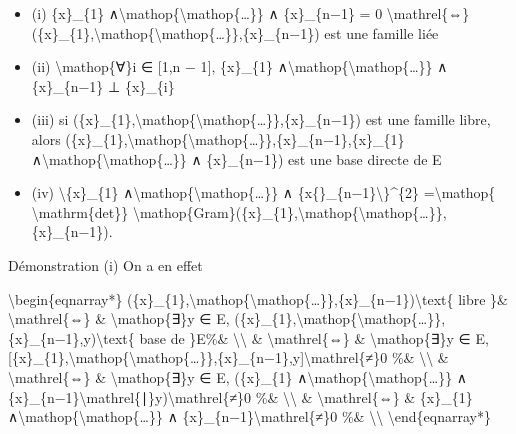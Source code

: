 \documentclass[]{article}
\begin{document}
\begin{itemize}
\itemsep1pt\parskip0pt
\item
  (i) \{x\}\_\{1\}
  ∧\textbackslash{}mathop\{\textbackslash{}mathop\{\ldots{}\}\} ∧
  \{x\}\_\{n−1\} = 0 \textbackslash{}mathrel\{⇔\}
  (\{x\}\_\{1\},\textbackslash{}mathop\{\textbackslash{}mathop\{\ldots{}\}\},\{x\}\_\{n−1\})
  est une famille liée
\item
  (ii) \textbackslash{}mathop\{∀\}i ∈ {[}1,n − 1{]}, \{x\}\_\{1\}
  ∧\textbackslash{}mathop\{\textbackslash{}mathop\{\ldots{}\}\} ∧
  \{x\}\_\{n−1\} ⊥ \{x\}\_\{i\}
\item
  (iii) si
  (\{x\}\_\{1\},\textbackslash{}mathop\{\textbackslash{}mathop\{\ldots{}\}\},\{x\}\_\{n−1\})
  est une famille libre, alors
  (\{x\}\_\{1\},\textbackslash{}mathop\{\textbackslash{}mathop\{\ldots{}\}\},\{x\}\_\{n−1\},\{x\}\_\{1\}
  ∧\textbackslash{}mathop\{\textbackslash{}mathop\{\ldots{}\}\} ∧
  \{x\}\_\{n−1\}) est une base directe de E
\item
  (iv) \textbackslash{}\textbar{}\{x\}\_\{1\}
  ∧\textbackslash{}mathop\{\textbackslash{}mathop\{\ldots{}\}\} ∧
  \{x\{\}\_\{n−1\}\textbackslash{}\textbar{}\}\^{}\{2\}
  =\textbackslash{}mathop\{ \textbackslash{}mathrm\{det\}\}
  \textbackslash{}mathop\{Gram\}(\{x\}\_\{1\},\textbackslash{}mathop\{\textbackslash{}mathop\{\ldots{}\}\},\{x\}\_\{n−1\}).
\end{itemize}

Démonstration (i) On a en effet

\textbackslash{}begin\{eqnarray*\}
(\{x\}\_\{1\},\textbackslash{}mathop\{\textbackslash{}mathop\{\ldots{}\}\},\{x\}\_\{n−1\})\textbackslash{}text\{
libre \}\& \textbackslash{}mathrel\{⇔\} \& \textbackslash{}mathop\{∃\}y
∈ E,
(\{x\}\_\{1\},\textbackslash{}mathop\{\textbackslash{}mathop\{\ldots{}\}\},\{x\}\_\{n−1\},y)\textbackslash{}text\{
base de \}E\%\& \textbackslash{}\textbackslash{} \&
\textbackslash{}mathrel\{⇔\} \& \textbackslash{}mathop\{∃\}y ∈ E,
{[}\{x\}\_\{1\},\textbackslash{}mathop\{\textbackslash{}mathop\{\ldots{}\}\},\{x\}\_\{n−1\},y{]}\textbackslash{}mathrel\{≠\}0
\%\& \textbackslash{}\textbackslash{} \& \textbackslash{}mathrel\{⇔\} \&
\textbackslash{}mathop\{∃\}y ∈ E, (\{x\}\_\{1\}
∧\textbackslash{}mathop\{\textbackslash{}mathop\{\ldots{}\}\} ∧
\{x\}\_\{n−1\}\textbackslash{}mathrel\{∣\}y)\textbackslash{}mathrel\{≠\}0
\%\& \textbackslash{}\textbackslash{} \& \textbackslash{}mathrel\{⇔\} \&
\{x\}\_\{1\}
∧\textbackslash{}mathop\{\textbackslash{}mathop\{\ldots{}\}\} ∧
\{x\}\_\{n−1\}\textbackslash{}mathrel\{≠\}0 \%\&
\textbackslash{}\textbackslash{} \textbackslash{}end\{eqnarray*\}
\end{document}
